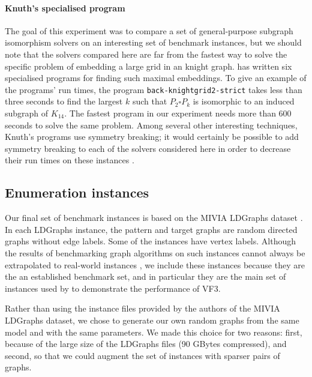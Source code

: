 \paragraph{Knuth's specialised program}
The goal of this experiment was to compare a set of general-purpose subgraph isomorphism
solvers on an interesting set of benchmark instances, but we should note that the solvers
compared here are far from the fastest way to solve the specific problem of embedding
a large grid in an knight graph.
\citet{knuth2022art} has written six specialised
programs for finding such maximal embeddings.  To give an example of the programs' run times,
the program \texttt{back-knightgrid2-strict} takes less than
three seconds to find the largest $k$ such that $P_2 \square P_k$
is isomorphic to an induced subgraph of $K_{14}$. The fastest
program in our experiment needs more than 600 seconds to solve the same problem.
Among several other interesting techniques, Knuth's programs use symmetry breaking;
it would certainly be possible to add symmetry breaking to each of the solvers considered
here in order to decrease their run times on these instances \citep{zampelli2007symmetry}.

\FloatBarrier

\subsection{Enumeration instances}\label{subsec:si-enumeration-experiment}

Our final set of benchmark instances is based on the MIVIA LDGraphs dataset
\citep{DBLP:journals/pami/CarlettiFSV18}.  In each LDGraphs instance, the pattern and
target graphs are random directed graphs without edge labels.
Some of the instances have vertex labels.
Although the results of benchmarking graph algorithms on such instances cannot
always be extrapolated to real-world instances \citep{DBLP:conf/cp/McCreeshPST17},
we include these instances because they are the an established benchmark set,
and in particular they are the main set of instances used by \cite{DBLP:journals/pami/CarlettiFSV18}
to demonstrate the performance of VF3.

Rather than using the instance files provided by the authors of the MIVIA LDGraphs
dataset, we chose to generate our own random graphs from the same model and with the
same parameters.  We made this choice for two reasons: first, because of the large size
of the LDGraphs files (90 GBytes compressed), and second, so that we could augment
the set of instances with sparser pairs of graphs.

